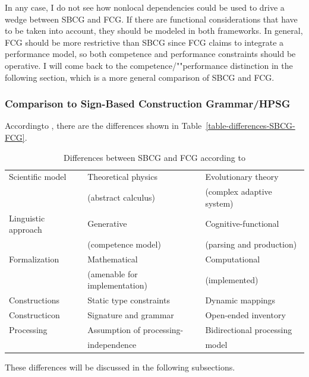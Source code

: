 In any case, I do not see how nonlocal dependencies could be used to drive a wedge between SBCG and
FCG. If there are functional considerations that have to be taken into account, they should be
modeled in both frameworks. In general, FCG should be more restrictive than SBCG since FCG claims to
integrate a performance model, so both competence and performance constraints should be operative. I
will come back to the competence/""performance distinction in the following section, which is a more
general comparison of SBCG and FCG.

\subsubsection{Comparison to Sign-Based Construction Grammar/HPSG}


According\indexhpsgstart\indexsbcgstart to \citet{vanTrijp2013a}, there are the differences shown in Table~\vref{table-differences-SBCG-FCG}.
\begin{table}
\caption{\label{table-differences-SBCG-FCG}Differences between SBCG and FCG according to \citet[]{vanTrijp2013a}}
\begin{tabular}{@{}lll@{}}\hline\hline
Scientific model    & Theoretical physics           & Evolutionary theory\\
                    & (abstract calculus)           &  (complex adaptive system)\\
Linguistic approach & Generative                    & Cognitive-functional\\
                    & (competence model)            & (parsing and production)\\
Formalization       & Mathematical                  & Computational\\ 
                    & (amenable for implementation) & (implemented)\\
Constructions       & Static type constraints       & Dynamic mappings\\
Constructicon       & Signature and grammar         & Open-ended inventory\\
Processing          & Assumption of processing-     & Bidirectional processing\\
                    & independence                  & model\\\hline\hline
\end{tabular}
\end{table}%
These differences will be discussed in the following subsections.

